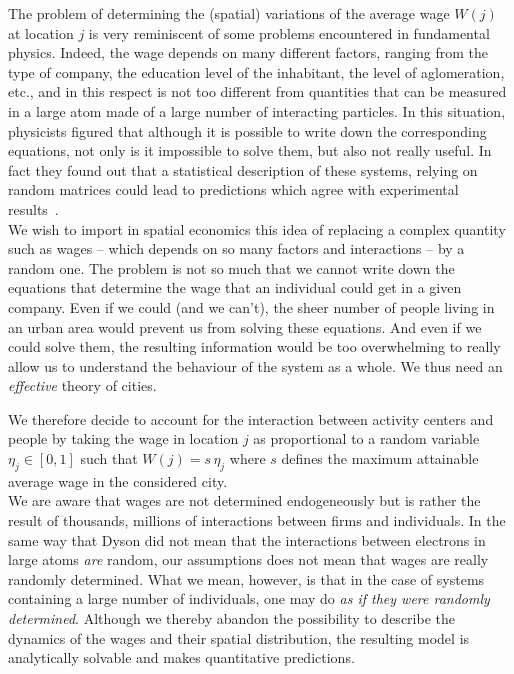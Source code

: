 The problem of determining the (spatial) variations of the average wage $W(j)$
at location $j$ is very reminiscent of some problems encountered in fundamental
physics. Indeed, the wage depends on many different factors, ranging from the
type of company, the education level of the inhabitant, the level of
aglomeration, etc., and in this respect is not too different from quantities
that can be measured in a large atom made of a large number of interacting
particles. In this situation, physicists figured that although it is possible
to write down the corresponding equations, not only is it impossible to solve
them, but also not really useful. In fact they found out that
a statistical description of these systems, relying on random matrices could
lead to predictions which agree with experimental results~\cite{Dyson:1962}.\\

We wish to import in spatial economics this idea of replacing a complex quantity
such as wages -- which depends on so many factors and interactions -- by a random
one. The problem is not so much that we cannot write down the equations that
determine the wage that an individual could get in a given company. Even if we
could (and we can't), the sheer number of people living in an urban area would prevent us
from solving these equations. And even if we could solve them, the resulting
information would be too overwhelming to really allow us to understand the
behaviour of the system as a whole. We thus need an \emph{effective}
theory of cities.

We therefore decide to account for the interaction between activity centers and
people by taking the wage in location $j$ as proportional to a random variable
$\eta_j \in \left[ 0,1\right]$ such that $W(j) = s\, \eta_j$ where $s$ defines
the maximum attainable average wage in the considered city.\\

We are aware that wages are not determined endogeneously but is rather the
result of thousands, millions of interactions between firms and individuals. In
the same way that Dyson did not mean that the interactions between electrons in
large atoms \emph{are} random, our assumptions does not mean that wages are
really randomly determined. What we mean, however, is that in the case of
systems containing a large number of individuals, one may do \emph{as
if they were randomly determined}. Although we thereby abandon the possibility
to describe the dynamics of the wages and their spatial distribution, the
resulting model is analytically solvable and makes quantitative predictions.

